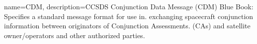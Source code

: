 {
    name=CDM,
    description={CCSDS Conjunction Data Message (CDM) Blue Book: Specifies a standard message format for use in. 
        exchanging spacecraft conjunction information between originators of Conjunction Assessments. (CAs) and 
        satellite owner/operators and other authorized parties.}
}